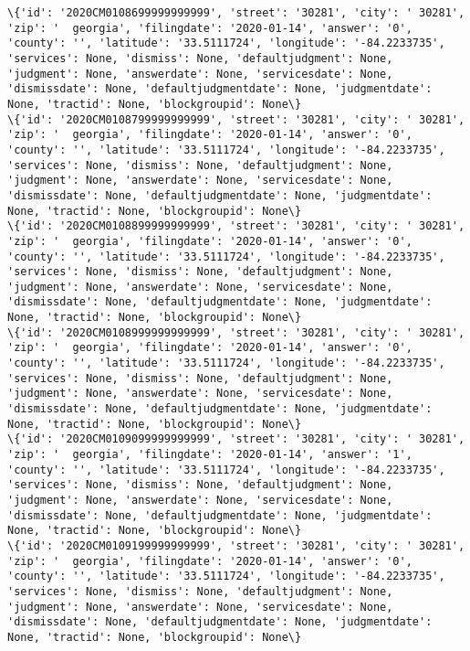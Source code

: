 \documentclass[11pt]{article}
\begin{document}
\begin{Verbatim}[commandchars=\\\{\}]
\{'id': '2020CM0108699999999999', 'street': '30281', 'city': ' 30281', 'zip': '  georgia', 'filingdate': '2020-01-14', 'answer': '0', 'county': '', 'latitude': '33.5111724', 'longitude': '-84.2233735', 'services': None, 'dismiss': None, 'defaultjudgment': None, 'judgment': None, 'answerdate': None, 'servicesdate': None, 'dismissdate': None, 'defaultjudgmentdate': None, 'judgmentdate': None, 'tractid': None, 'blockgroupid': None\}
\{'id': '2020CM0108799999999999', 'street': '30281', 'city': ' 30281', 'zip': '  georgia', 'filingdate': '2020-01-14', 'answer': '0', 'county': '', 'latitude': '33.5111724', 'longitude': '-84.2233735', 'services': None, 'dismiss': None, 'defaultjudgment': None, 'judgment': None, 'answerdate': None, 'servicesdate': None, 'dismissdate': None, 'defaultjudgmentdate': None, 'judgmentdate': None, 'tractid': None, 'blockgroupid': None\}
\{'id': '2020CM0108899999999999', 'street': '30281', 'city': ' 30281', 'zip': '  georgia', 'filingdate': '2020-01-14', 'answer': '0', 'county': '', 'latitude': '33.5111724', 'longitude': '-84.2233735', 'services': None, 'dismiss': None, 'defaultjudgment': None, 'judgment': None, 'answerdate': None, 'servicesdate': None, 'dismissdate': None, 'defaultjudgmentdate': None, 'judgmentdate': None, 'tractid': None, 'blockgroupid': None\}
\{'id': '2020CM0108999999999999', 'street': '30281', 'city': ' 30281', 'zip': '  georgia', 'filingdate': '2020-01-14', 'answer': '0', 'county': '', 'latitude': '33.5111724', 'longitude': '-84.2233735', 'services': None, 'dismiss': None, 'defaultjudgment': None, 'judgment': None, 'answerdate': None, 'servicesdate': None, 'dismissdate': None, 'defaultjudgmentdate': None, 'judgmentdate': None, 'tractid': None, 'blockgroupid': None\}
\{'id': '2020CM0109099999999999', 'street': '30281', 'city': ' 30281', 'zip': '  georgia', 'filingdate': '2020-01-14', 'answer': '1', 'county': '', 'latitude': '33.5111724', 'longitude': '-84.2233735', 'services': None, 'dismiss': None, 'defaultjudgment': None, 'judgment': None, 'answerdate': None, 'servicesdate': None, 'dismissdate': None, 'defaultjudgmentdate': None, 'judgmentdate': None, 'tractid': None, 'blockgroupid': None\}
\{'id': '2020CM0109199999999999', 'street': '30281', 'city': ' 30281', 'zip': '  georgia', 'filingdate': '2020-01-14', 'answer': '0', 'county': '', 'latitude': '33.5111724', 'longitude': '-84.2233735', 'services': None, 'dismiss': None, 'defaultjudgment': None, 'judgment': None, 'answerdate': None, 'servicesdate': None, 'dismissdate': None, 'defaultjudgmentdate': None, 'judgmentdate': None, 'tractid': None, 'blockgroupid': None\}

\end{Verbatim}
\end{document}
